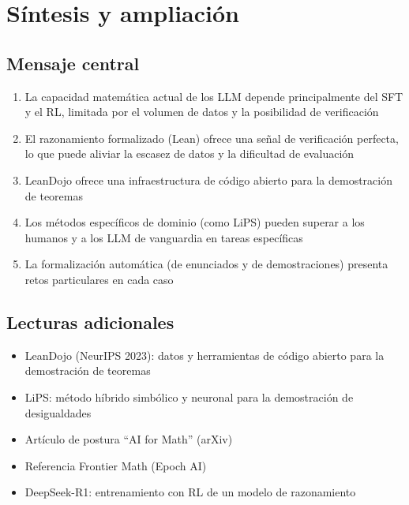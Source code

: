 \section{Síntesis y ampliación}

\subsection{Mensaje central}

\begin{enumerate}
    \item La capacidad matemática actual de los LLM depende principalmente del SFT y el RL, limitada por el volumen de datos y la posibilidad de verificación
    \item El razonamiento formalizado (Lean) ofrece una señal de verificación perfecta, lo que puede aliviar la escasez de datos y la dificultad de evaluación
    \item LeanDojo ofrece una infraestructura de código abierto para la demostración de teoremas
    \item Los métodos específicos de dominio (como LiPS) pueden superar a los humanos y a los LLM de vanguardia en tareas específicas
    \item La formalización automática (de enunciados y de demostraciones) presenta retos particulares en cada caso
\end{enumerate}

\subsection{Lecturas adicionales}
\begin{itemize}
    \item LeanDojo (NeurIPS 2023): datos y herramientas de código abierto para la demostración de teoremas
    \item LiPS: método híbrido simbólico y neuronal para la demostración de desigualdades
    \item Artículo de postura ``AI for Math'' (arXiv)
    \item Referencia Frontier Math (Epoch AI)
    \item DeepSeek-R1: entrenamiento con RL de un modelo de razonamiento
\end{itemize}


